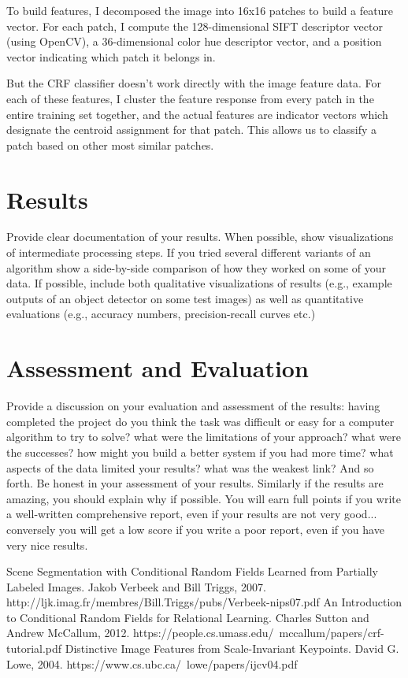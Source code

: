 \documentclass{article}
\begin{document}
To build features, I decomposed the image into 16x16 patches to build
a feature vector. For each patch, I compute the 128-dimensional
SIFT descriptor vector (using OpenCV), a 36-dimensional color hue descriptor
vector, and a position vector indicating which patch it belongs in.

But the CRF classifier doesn't work directly with the image feature data.
For each of these features, I cluster the feature response from
every patch in the entire training set together, and the actual features
are indicator vectors which designate the centroid assignment for that patch.
This allows us to classify a patch based on other most similar patches.

\section{Results}

Provide clear documentation of your results.   When possible, show visualizations of intermediate processing steps.  If you tried several different variants of an algorithm show a side-by-side comparison of how they worked on some of your data. If possible, include both qualitative visualizations of results (e.g., example outputs of an object detector on some test images) as well as quantitative evaluations (e.g., accuracy numbers, precision-recall curves etc.)

\section{Assessment and Evaluation}

Provide a discussion on your evaluation and assessment of the results:   having completed the project do you think the task was difficult or easy for a computer algorithm to try to solve? what were the limitations of your approach? what were the successes? how might you build a better system if you had more time? what aspects of the data limited your results? what was the weakest link? And so forth. Be honest in your assessment of your results. Similarly if the results are amazing, you should explain why if possible. You will earn full points if you write a well-written comprehensive report, even if your results are not very good... conversely you will get a low score if you write a poor report, even if you have very nice results.


\begin{thebibliography}{widest entry}
  Scene Segmentation with Conditional Random Fields Learned from Partially Labeled Images. Jakob Verbeek and Bill Triggs, 2007. http://ljk.imag.fr/membres/Bill.Triggs/pubs/Verbeek-nips07.pdf
  An Introduction to Conditional Random
Fields for Relational Learning. Charles Sutton and Andrew McCallum, 2012. https://people.cs.umass.edu/~mccallum/papers/crf-tutorial.pdf
 Distinctive Image Features
from Scale-Invariant Keypoints. David G. Lowe, 2004.  https://www.cs.ubc.ca/~lowe/papers/ijcv04.pdf
\end{thebibliography}
\end{document}
